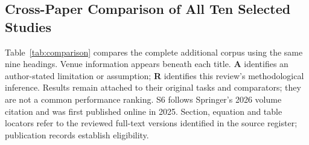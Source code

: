 \documentclass[11pt,a4paper]{article}
\begin{document}
\begin{landscape}
\subsection*{Cross-Paper Comparison of All Ten Selected Studies}
\small
Table~\ref{tab:comparison} compares the complete additional corpus using the
same nine headings. Venue information appears beneath each title.
\textbf{A} identifies an author-stated limitation or assumption;
\textbf{R} identifies this review's methodological inference. Results remain
attached to their original tasks and comparators; they are not a common
performance ranking. S6 follows Springer's 2026 volume citation and was first
published online in 2025.
Section, equation and table locators refer to the reviewed full-text versions
identified in the source register; publication records establish eligibility.


\end{landscape}
\end{document}
